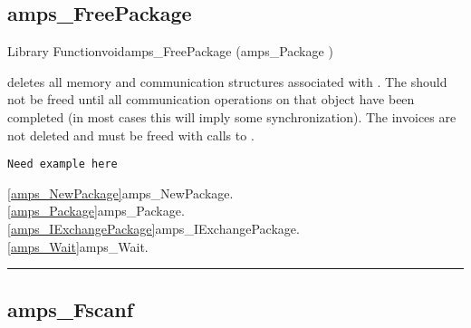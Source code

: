 \subsection{amps\_FreePackage}
\label{amps_FreePackage}


\begin{deftypefn}{Library Function}{void}{amps\_FreePackage}
(amps_Package )

\DESCRIPTION

 deletes all memory and communication structures
associated with .  The  should not be freed
until all communication operations on that object have been completed
(in most cases this will imply some synchronization).  The invoices are
not deleted and must be freed with calls to .

\begin{display}\begin{verbatim}
Need example here
\end{verbatim}\end{display}

\SEEALSO
\vref{amps_NewPackage}{amps\_NewPackage}. \\
\vref{amps_Package}{amps\_Package}. \\
\vref{amps_IExchangePackage}{amps\_IExchangePackage}. \\
\vref{amps_Wait}{amps\_Wait}. \\

\end{deftypefn}



\noindent\rule{\textwidth}{1mm}

\subsection{amps\_Fscanf}
\label{amps_Fscanf}



